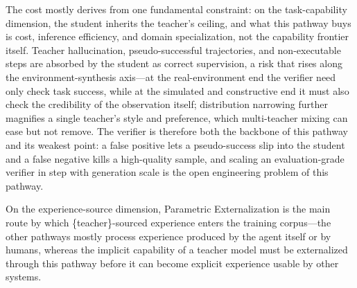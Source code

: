 The cost mostly derives from one fundamental constraint: on the task-capability dimension, the student inherits the teacher's ceiling, and what this pathway buys is cost, inference efficiency, and domain specialization, not the capability frontier itself. Teacher hallucination, pseudo-successful trajectories, and non-executable steps are absorbed by the student as correct supervision, a risk that rises along the environment-synthesis axis---at the real-environment end the verifier need only check task success, while at the simulated and constructive end it must also check the credibility of the observation itself; distribution narrowing further magnifies a single teacher's style and preference, which multi-teacher mixing can ease but not remove. The verifier is therefore both the backbone of this pathway and its weakest point: a false positive lets a pseudo-success slip into the student and a false negative kills a high-quality sample, and scaling an evaluation-grade verifier in step with generation scale is the open engineering problem of this pathway.

On the experience-source dimension, Parametric Externalization is the main route by which \{teacher\}-sourced experience enters the training corpus---the other pathways mostly process experience produced by the agent itself or by humans, whereas the implicit capability of a teacher model must be externalized through this pathway before it can become explicit experience usable by other systems.
